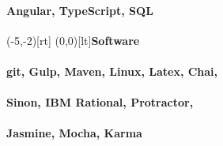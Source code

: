 \documentclass[9pt]{extarticle}
\newcommand{\Subsection}[2]{
    \makebox(-5,-2)[rt]{}
    \makebox(0,0)[lt]{\normalsize\bfseries\color{subsection}#1}
    \vspace{1em}
    #2
}
\begin{document}
\begin{paracol}{2}
\begin{rightcolumn}
{                \paragraph{Angular, TypeScript, SQL}
            }
            \vfill
            \Subsection{Software}{
                \paragraph{git, Gulp, Maven, Linux, Latex, Chai,}
                \paragraph{Sinon, IBM Rational, Protractor,}
                \paragraph{Jasmine, Mocha, Karma}
            }
        \pagebreak
    \end{rightcolumn}
\end{paracol}
\end{document}
